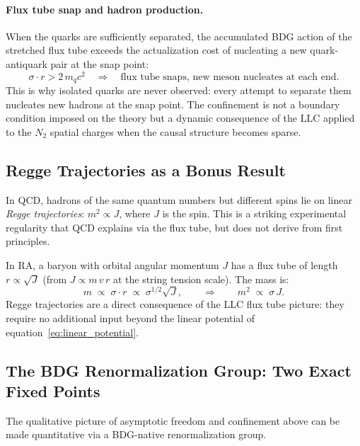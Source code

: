 \documentclass[11pt,a4paper]{article}
\begin{document}
\paragraph{Flux tube snap and hadron production.}
When the quarks are sufficiently separated, the accumulated BDG action of
the stretched flux tube exceeds the actualization cost of nucleating a new
quark-antiquark pair at the snap point:
\begin{equation}
  \sigma \cdot r > 2\,m_q c^2
  \quad\Rightarrow\quad
  \text{flux tube snaps, new meson nucleates at each end.}
  \label{eq:flux_snap}
\end{equation}
This is why isolated quarks are never observed: every attempt to separate them
nucleates new hadrons at the snap point. The confinement is not a boundary
condition imposed on the theory but a dynamic consequence of the LLC applied
to the $N_2$ spatial charges when the causal structure becomes sparse.

\subsection{Regge Trajectories as a Bonus Result}

In QCD, hadrons of the same quantum numbers but different spins lie on linear
\emph{Regge trajectories}: $m^2 \propto J$, where $J$ is the spin. This is
a striking experimental regularity that QCD explains via the flux tube, but
does not derive from first principles.

In RA, a baryon with orbital angular momentum $J$ has a flux tube of length
$r \propto \sqrt{J}$ (from $J \propto m\,v\,r$ at the string tension scale).
The mass is:
\begin{equation}
  m \;\propto\; \sigma \cdot r \;\propto\; \sigma^{1/2} \sqrt{J},
  \qquad\Rightarrow\qquad
  m^2 \;\propto\; \sigma\, J.
  \label{eq:regge}
\end{equation}
Regge trajectories are a direct consequence of the LLC flux tube picture:
they require no additional input beyond the linear potential of
equation~\eqref{eq:linear_potential}.

\subsection{The BDG Renormalization Group: Two Exact Fixed Points}
\label{sec:bdg_rg}

The qualitative picture of asymptotic freedom and confinement above can be
made quantitative via a BDG-native renormalization group.
\end{document}
